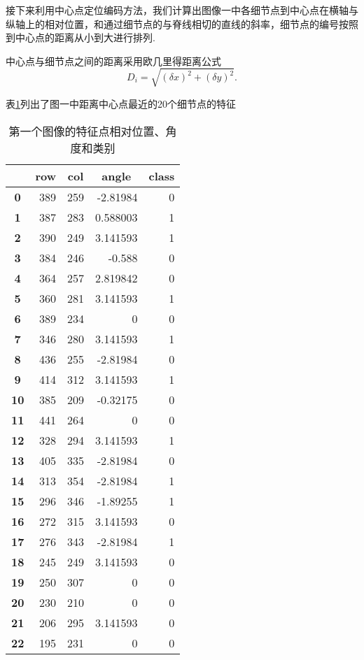 \documentclass[withoutpreface,bwprint]{cumcmthesis} %
\begin{document}
接下来利用中心点定位编码方法，我们计算出图像一中各细节点到中心点在横轴与纵轴上的相对位置，和通过细节点的与脊线相切的直线的斜率，细节点的编号按照到中心点的距离从小到大进行排列.

中心点与细节点之间的距离采用欧几里得距离公式
\begin{equation}
D_{i}=\sqrt{(\delta x)^2+(\delta y)^2}.
\end{equation}

表\ref{tab:feature}列出了图一中距离中心点最近的20个细节点的特征

\begin{table}[htbp]
	\centering
	\caption{第一个图像的特征点相对位置、角度和类别}
	  \begin{tabular}{crrrr}
	  \toprule
			& \multicolumn{1}{c}{\textbf{row}} & \multicolumn{1}{c}{\textbf{col}} & \multicolumn{1}{c}{\textbf{angle}} & \multicolumn{1}{c}{\textbf{class}} \\
	  \midrule
	  \textbf{0} & 389   & 259   & -2.81984 & 0 \\
	  \textbf{1} & 387   & 283   & 0.588003 & 1 \\
	  \textbf{2} & 390   & 249   & 3.141593 & 1 \\
	  \textbf{3} & 384   & 246   & -0.588 & 0 \\
	  \textbf{4} & 364   & 257   & 2.819842 & 0 \\
	  \textbf{5} & 360   & 281   & 3.141593 & 1 \\
	  \textbf{6} & 389   & 234   & 0     & 0 \\
	  \textbf{7} & 346   & 280   & 3.141593 & 1 \\
	  \textbf{8} & 436   & 255   & -2.81984 & 0 \\
	  \textbf{9} & 414   & 312   & 3.141593 & 1 \\
	  \textbf{10} & 385   & 209   & -0.32175 & 0 \\
	  \textbf{11} & 441   & 264   & 0     & 0 \\
	  \textbf{12} & 328   & 294   & 3.141593 & 1 \\
	  \textbf{13} & 405   & 335   & -2.81984 & 0 \\
	  \textbf{14} & 313   & 354   & -2.81984 & 1 \\
	  \textbf{15} & 296   & 346   & -1.89255 & 1 \\
	  \textbf{16} & 272   & 315   & 3.141593 & 0 \\
	  \textbf{17} & 276   & 343   & -2.81984 & 1 \\
	  \textbf{18} & 245   & 249   & 3.141593 & 0 \\
	  \textbf{19} & 250   & 307   & 0     & 0 \\
	  \textbf{20} & 230   & 210   & 0     & 0 \\
	  \textbf{21} & 206   & 295   & 3.141593 & 0 \\
	  \textbf{22} & 195   & 231   & 0     & 0 \\
	  \bottomrule
	  \end{tabular}%
	\label{tab:feature}%
	
  \end{table}%
\newpage
\end{document}
